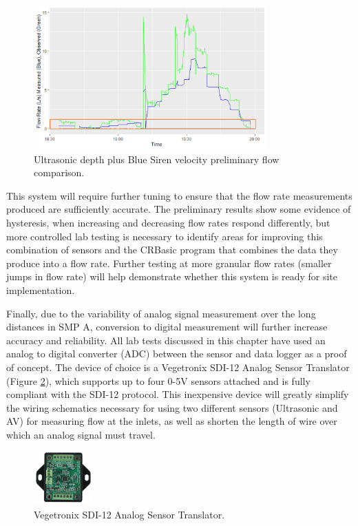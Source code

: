 \begin{figure}[h!]
	\centering
	\includegraphics[width=0.8\textwidth]{gfx/chapter-instrumentation/us-flow-test.png}
	\caption{Ultrasonic depth plus Blue Siren velocity preliminary flow comparison.}
	\label{fig:ultrasonic-lab-test-results}
\end{figure}

This system will require further tuning to ensure that the flow rate measurements produced are sufficiently accurate.
The preliminary results show some evidence of hysteresis, when increasing and decreasing flow rates respond differently, but more controlled lab testing is necessary to identify areas for improving this combination of sensors and the CRBasic program that combines the data they produce into a flow rate.
Further testing at more granular flow rates (smaller jumps in flow rate) will help demonstrate whether this system is ready for site implementation.

Finally, due to the variability of analog signal measurement over the long distances in SMP A, conversion to digital measurement will further increase accuracy and reliability.
All lab tests discussed in this chapter have used an analog to digital converter (ADC) between the sensor and data logger as a proof of concept.
The device of choice is a Vegetronix SDI-12 Analog Sensor Translator (Figure \ref{fig:vegetronix}), which supports up to four 0-5V sensors attached and is fully compliant with the SDI-12 protocol.
This inexpensive device will greatly simplify the wiring schematics necessary for using two different sensors (Ultrasonic and AV) for measuring flow at the inlets, as well as shorten the length of wire over which an analog signal must travel.

\begin{figure}[ht!]
	\centering
	\includegraphics[width=0.2\textwidth]{gfx/chapter-instrumentation/vegetronix-sdi12-converter.jpg}
	\caption{Vegetronix SDI-12 Analog Sensor Translator.}
	\label{fig:vegetronix}
\end{figure}

